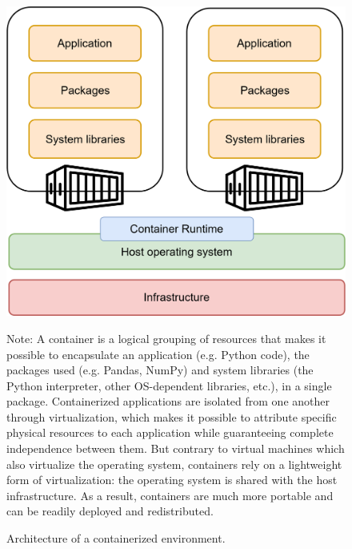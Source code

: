 \begin{figure}[htbp]
    \includegraphics[width=\linewidth]{sections/img/containers.png}
    \caption{Architecture of a containerized environment.}
    \label{fig:containers}
    \medskip
    {\footnotesize Note: A container is a logical grouping of resources that makes it possible to encapsulate an application (e.g. Python code), the packages used (e.g. Pandas, NumPy) and system libraries (the Python interpreter, other OS-dependent libraries, etc.), in a single package. Containerized applications are isolated from one another through virtualization, which makes it possible to attribute specific physical resources to each application while guaranteeing complete independence between them. But contrary to virtual machines which also virtualize the operating system, containers rely on a lightweight form of virtualization: the operating system is shared with the host infrastructure. As a result, containers are much more portable and can be readily deployed and redistributed.}
\end{figure}

